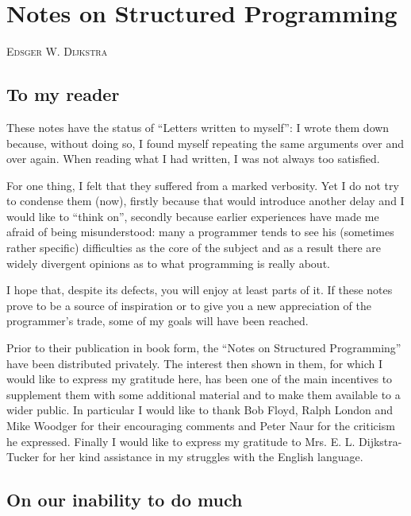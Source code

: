 \chapter{Notes on Structured Programming}

{
	\noindent
	\scshape\hfill\scriptsize Edsger W. Dijkstra\hfill
}
\renewcommand{\leftmark}{\normalfont\scriptsize\hfill E. W. DIJKSTRA\hfill}

\section{To my reader}

These notes have the status of ``Letters written to myself'': I wrote them down because, without doing so, I found myself repeating the same arguments over and over again. When reading what I had written, I was not always too satisfied.

For one thing, I felt that they suffered from a marked verbosity. Yet I do not try to condense them (now), firstly because that would introduce another delay and I would like to ``think on'', secondly because earlier experiences have made me afraid of being misunderstood: many a programmer tends to see his (sometimes rather specific) difficulties as the core of the subject and as a result there are widely divergent opinions as to what programming is really about.

I hope that, despite its defects, you will enjoy at least parts of it. If these notes prove to be a source of inspiration or to give you a new appreciation of the programmer's trade, some of my goals will have been reached.

Prior to their publication in book form, the ``Notes on Structured Programming'' have been distributed privately. The interest then shown in
them, for which I would like to express my gratitude here, has been one of the main incentives to supplement them with some additional material and to make them available to a wider public. In particular I would like to thank Bob Floyd, Ralph London and Mike Woodger for their encouraging
comments and Peter Naur for the criticism he expressed. Finally I would like to express my gratitude to Mrs. E. L. Dijkstra-Tucker for her kind
assistance in my struggles with the English language.

\section{On our inability to do much}
\label{sec:our-inability-to-do-much}

